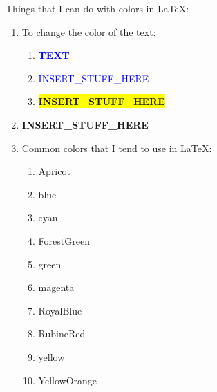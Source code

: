 Things that I can do with colors in \LaTeX: \vspace{-0.3cm}
\begin{enumerate} \itemsep -4pt
\item To change the color of the text: \vspace{-0.3cm}
	\begin{enumerate} \itemsep -2pt
	\item \textcolor{blue}{\bf TEXT}						%
	\item \textcolor{blue}{INSERT\_STUFF\_HERE}		%
	\item \colorbox{yellow}{\bf INSERT\_STUFF\_HERE}		%
	\end{enumerate}
\item {\bf \color{red} INSERT\_STUFF\_HERE}				%
\item Common colors that I tend to use in \LaTeX: \vspace{-0.3cm}
	\begin{enumerate} \itemsep -2pt
	\item Apricot
	\item blue
	\item cyan
	\item ForestGreen
	\item green
	\item magenta
	\item RoyalBlue
	\item RubineRed
	\item yellow
	\item YellowOrange
	\end{enumerate}
\end{enumerate}


